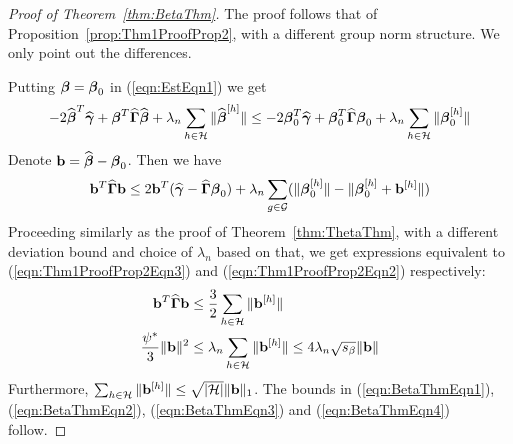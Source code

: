 \documentclass[12pt, letterpaper]{article}
\numberwithin{equation}{section}
\begin{document}
\begin{proof}[Proof of Theorem~\ref{thm:BetaThm}]
The proof follows that of Proposition~\ref{prop:Thm1ProofProp2}, with a different group norm structure. We only point out the differences.

Putting ${\boldsymbol{\beta}} = {\boldsymbol{\beta}}_0$ in (\ref{eqn:EstEqn1}) we get
%
$$
-2 \widehat {{\boldsymbol{\beta}}}^T \widehat {{\boldsymbol{\gamma}}} + {\boldsymbol{\beta}}^T \widehat {{\boldsymbol{\Gamma}}} \widehat {{\boldsymbol{\beta}}} + \lambda_n \sum_{h \in {\cal{H}}} \| \widehat {{\boldsymbol{\beta}}}^{[h]}  \| \leq
-2 {\boldsymbol{\beta}}_0^T \widehat {{\boldsymbol{\gamma}}} + {\boldsymbol{\beta}}_0^T \widehat {{\boldsymbol{\Gamma}}} {\boldsymbol{\beta}}_0 + \lambda_n \sum_{h \in {\cal{H}}} \| {\boldsymbol{\beta}}_0^{[h]}  \|
$$
%
Denote ${\bf{b}} = \widehat {{\boldsymbol{\beta}}} - {\boldsymbol{\beta}}_0$. Then we have
%
$$
{\bf{b}}^T \widehat {{\boldsymbol{\Gamma}}} {\bf{b}} \leq 2 {\bf{b}}^T ( \widehat {{\boldsymbol{\gamma}}} - \widehat {{\boldsymbol{\Gamma}}} {\boldsymbol{\beta}}_0 ) + \lambda_n
\sum_{g \in {\cal{G}}} ( \| {\boldsymbol{\beta}}_0^{[h]} \| - \| {\boldsymbol{\beta}}_0^{[h]} + {\bf{b}}^{[h]} \|)
$$
%
Proceeding similarly as the proof of Theorem~\ref{thm:ThetaThm}, with a different deviation bound and choice of $\lambda_n$ based on that, we get expressions equivalent to (\ref{eqn:Thm1ProofProp2Eqn3}) and (\ref{eqn:Thm1ProofProp2Eqn2}) respectively:
%
\begin{align}
{\bf{b}}^T \widehat {{\boldsymbol{\Gamma}}} {\bf{b}} & \leq \frac{3}{2} \sum_{h \in {\cal{H}}} \| {\bf{b}}^{[h]} \| \\
\frac{\psi^*}{3} \| {\bf{b}} \|^2 & \leq \lambda_n \sum_{h \in {\cal{H}}} \| {\bf{b}}^{[h]} \| \leq 4 \lambda_n \sqrt{s_\beta} \| {\bf{b}} \|
\end{align}
%
Furthermore, $\sum_{h \in {\cal{H}}} \| {\bf{b}}^{[h]} \| \leq \sqrt{ | {\cal{H}}|} \| {\bf{b}} \|_1$. The bounds in (\ref{eqn:BetaThmEqn1}), (\ref{eqn:BetaThmEqn2}), (\ref{eqn:BetaThmEqn3}) and (\ref{eqn:BetaThmEqn4}) 
follow.

\end{proof}
\end{document}
